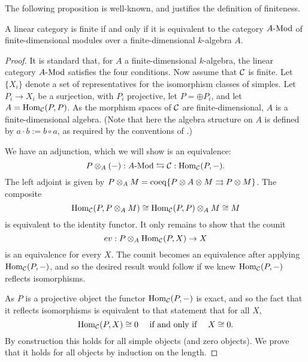 \documentclass{amsart}
\begin{document}
The following proposition is well-known, and justifies the definition of finiteness.

\begin{proposition}
A linear category is finite if and only if it is equivalent to the category $\Mod{A}{}$ of finite-dimensional modules over a finite-dimensional $k$-algebra $A$.
\end{proposition}
\begin{proof}
	It is standard that, for $A$ a finite-dimensional $k$-algebra, the linear category $\Mod{A}{}$ satisfies the four conditions. %
	Now assume that $\mathcal C$ is finite. Let $\{X_i\}$ denote a set of representatives for the isomorphism classes of simples. Let $P_i \to X_i$ be a surjection, with $P_i$ projective, let $P = \oplus P_i$, and let $A = \operatorname{Hom}_{\mathcal C}(P,P)$. As the morphism spaces of $\mathcal C$ are finite-dimensional, $A$ is a finite-dimensional algebra.  (Note that here the algebra structure on $A$ is defined by $a \cdot b := b \circ a$, as required by the conventions of \cite{DTCI}.)
	
We have an adjunction, which we will show is an equivalence:
	\begin{equation*}
		P \otimes_A (-):\Mod{A}{} \leftrightarrows \cC: \Hom_{\cC}(P,-).
	\end{equation*}
	The left adjoint is given by $P \otimes_A M = \operatorname{coeq}\{ P \otimes A \otimes M \rightrightarrows P \otimes M\}$. 
The composite 
\begin{equation*}
	\operatorname{Hom}_{\mathcal C}(P, P \otimes_A M) \cong \operatorname{Hom}_{\mathcal C}(P, P) \otimes_A M \cong M
\end{equation*}
 is equivalent to the identity functor. It only remains to show that the counit 
\begin{equation*}
	ev:P \otimes_A \operatorname{Hom}_{\mathcal C}(P, X) \to X
\end{equation*}
is an equivalence for every $X$. The counit becomes an equivalence after applying $\operatorname{Hom}_{\mathcal C}(P,-)$, and so the desired result would follow if we knew $\operatorname{Hom}_{\mathcal C}(P,-)$ reflects isomorphisms. 

As $P$ is a projective object the functor $\operatorname{Hom}_{\mathcal C}(P,-)$ is exact, and so the fact that it reflects isomorphisms is equivalent to that statement that for all $X$, 
\begin{equation*}
	\operatorname{Hom}_{\mathcal C}(P,X) \cong 0 \quad \textrm{ if and only if } \quad X \cong 0.
\end{equation*} 
By construction this holds for all simple objects (and zero objects). We prove that it holds for all objects by induction on the length. 


\end{proof}
\end{document}
